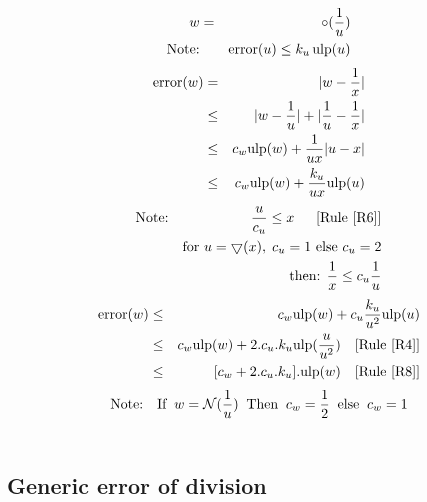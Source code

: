\documentclass[12pt]{amsart}
\def\n{\textnormal}
\def\minf{\bigtriangledown}
\def\ulp{{\rm ulp}}
\def\N{{\mathcal N}}
\newcommand{\U}[1]{\quad \mbox{[Rule~\ref{#1}]}}
\DeclareMathOperator{\error}{error}
\begin{document}
\begin{eqnarray}\nonumber
w&=&\circ(\frac{1}{u}) \\\nonumber
\textnormal{Note:}&& \error(u) \leq k_u \, \ulp(u)
\end{eqnarray}
\begin{eqnarray}\nonumber
\error(w)& = &|w - \frac{1}{x}| \\\nonumber
& \leq &|w - \frac{1}{u}| +|\frac{1}{u} - \frac{1}{x}| \\\nonumber
& \leq & c_w \ulp(w) + \frac{1}{ux}|u-x| \\\nonumber
& \leq & c_w \ulp(w) + \frac{k_u}{ux} \ulp(u)
\end{eqnarray}
\begin{eqnarray}\nonumber
\textnormal{Note:}&& \frac{u}{c_u} \leq x\;\; \U{R6}\\\nonumber
&&\n{for } u=\minf(x),\;c_u=1 \n{ else } c_u=2\\\nonumber
&& \n{then: } \frac{1}{x} \leq c_u \frac{1}{u}
\end{eqnarray}
\begin{eqnarray}\nonumber
\error(w)& \leq & c_w \ulp(w) + c_u\frac{k_u}{u^2} \ulp(u)\\\nonumber
& \leq & c_w \ulp(w) + 2.c_u.k_u \ulp(\frac{u}{u^2}) \U{R4}\\\nonumber
& \leq & [c_w + 2.c_u.k_u].\ulp(w) \U{R8}
\end{eqnarray}
\begin{eqnarray}\nonumber
\textnormal{Note:}&&\textnormal{If}\;\; w=\N(\frac{1}{u}) \;\;\textnormal{Then}\;\; c_w =\frac{1}{2} \;\;\textnormal{else}\;\; c_w =1\\\nonumber\end{eqnarray}

\subsection{Generic error of division}\label{generic:div}
\end{document}
